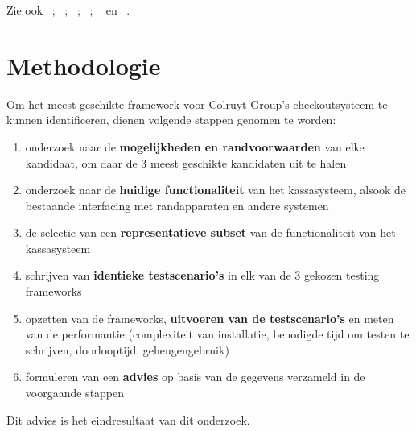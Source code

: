 \vspace{\baselineskip}

Zie ook ~\cite{Castro2019}; ~\cite{Definition2019}; ~\cite{Kamalizade2019}; ~\cite{Lotanna2019}; ~\cite{Roy2019} en ~\cite{Zaidman2019}.





\section{Methodologie}
\label{sec:methodologie}

Om het meest geschikte framework voor Colruyt Group's checkoutsysteem te kunnen identificeren, dienen volgende stappen genomen te worden:

\begin{enumerate}
    \item onderzoek naar de \textbf{mogelijkheden en randvoorwaarden} van elke kandidaat, om daar de 3 meest geschikte kandidaten uit te halen
    \item onderzoek naar de \textbf{huidige functionaliteit} van het kassasysteem, alsook de bestaande interfacing met randapparaten en andere systemen
    \item de selectie van een \textbf{representatieve subset} van de functionaliteit van het kassasysteem
    \item schrijven van \textbf{identieke testscenario's} in elk van de 3 gekozen testing frameworks
    \item opzetten van de frameworks, \textbf{uitvoeren van de testscenario's} en meten van de performantie (complexiteit van installatie, benodigde tijd om testen te schrijven, doorlooptijd, geheugengebruik)
    \item formuleren van een \textbf{advies} op basis van de gegevens verzameld in de voorgaande stappen
\end{enumerate}
\vspace{\baselineskip}
Dit advies is het eindresultaat van dit onderzoek.


